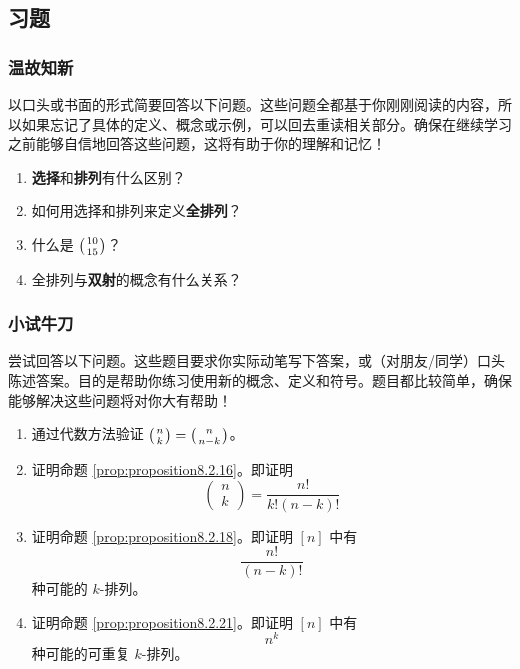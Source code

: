 
\subsection{习题}\label{sec:section8.2.4}

\subsubsection*{温故知新}

以口头或书面的形式简要回答以下问题。这些问题全都基于你刚刚阅读的内容，所以如果忘记了具体的定义、概念或示例，可以回去重读相关部分。确保在继续学习之前能够自信地回答这些问题，这将有助于你的理解和记忆！

\begin{enumerate}[label=(\arabic*)]
    \item \textbf{选择}和\textbf{排列}有什么区别？
    \item 如何用选择和排列来定义\textbf{全排列}？
    \item 什么是 $\big({10 \atop 15}\big)$？
    \item 全排列与\textbf{双射}的概念有什么关系？
\end{enumerate}

\subsubsection*{小试牛刀}

尝试回答以下问题。这些题目要求你实际动笔写下答案，或（对朋友/同学）口头陈述答案。目的是帮助你练习使用新的概念、定义和符号。题目都比较简单，确保能够解决这些问题将对你大有帮助！

\begin{enumerate}[label=(\arabic*)]
    \item 通过代数方法验证 $\big({n \atop k}\big) = \big({n \atop {n-k}}\big)$。
    \item 证明命题 \ref{prop:proposition8.2.16}。即证明
        \[\begin{pmatrix}
            n \\
            k
        \end{pmatrix} = \frac{n!}{k!(n-k)!}\]\label{exc:exercises8.2.2}
    \item 证明命题 \ref{prop:proposition8.2.18}。即证明 $[n]$ 中有
        \[\frac{n!}{(n-k)!}\]
        种可能的 $k$-排列。\label{exc:exercises8.2.3}
    \item 证明命题 \ref{prop:proposition8.2.21}。即证明 $[n]$ 中有
        \[n^k\]
        种可能的可重复 $k$-排列。\label{exc:exercises8.2.4}
\end{enumerate}
